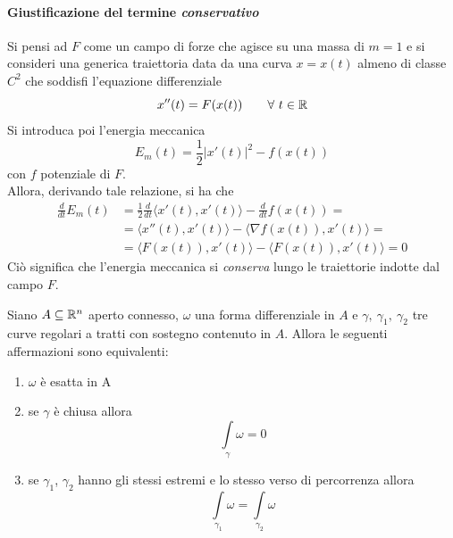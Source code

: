 \paragraph{Giustificazione del termine \textit{conservativo}}
Si pensi ad $F$ come un campo di forze che agisce su una massa di $m=1$ e si consideri una generica traiettoria data da una curva $x=x(t)$ almeno di classe $C^2$ che soddisfi l'equazione differenziale 
\begin{equation*}
    x''(t)=F(x(t)) \qquad \forall\ t \in \mathbb{R}
\end{equation*}
Si introduca poi l'energia meccanica 
\begin{equation*}
    E_m(t)= \frac{1}{2} |x'(t)|^2- f(x(t))
\end{equation*}
con $f$ potenziale di $F$.\\
Allora, derivando tale relazione, si ha che
\begin{equation*}
\begin{aligned}
        \frac{d}{dt}{E_m(t)}&=\frac{1}{2} \frac{d}{dt}{ \langle x'(t), x'(t) \rangle}- \frac{d}{dt}{f(x(t))}=\\
        &= \langle x''(t), x'(t) \rangle- \langle \nabla f(x(t)), x'(t) \rangle =\\
        &= \langle F(x(t)), x'(t) \rangle - \langle F(x(t)), x'(t) \rangle =0
\end{aligned}    
\end{equation*}
Ciò significa che l'energia meccanica si \textit{conserva} lungo le traiettorie indotte dal campo $F$.
\begin{theorem} \label{Teo: Caratterizzazione forme esatte}
Siano $A \subseteq \mathbb{R}^n$ aperto connesso, $\omega$ una forma differenziale in $A$ e $\gamma,\ \gamma_1,\ \gamma_2$ tre curve regolari a tratti con sostegno contenuto in $A$. Allora le seguenti affermazioni sono equivalenti:
\begin{enumerate}
    \item $\omega$ è esatta in A
    \item se $\gamma$ è chiusa allora 
    \begin{equation*}
        \int\limits_{\gamma}{\omega}=0
    \end{equation*}
    \item se $\gamma_1$, $\gamma_2$ hanno gli stessi estremi e lo stesso verso di percorrenza allora
    \begin{equation*}
        \int\limits_{\gamma_1}{\omega} = \int\limits_{\gamma_2}{\omega}
    \end{equation*}
\end{enumerate}
\end{theorem}
